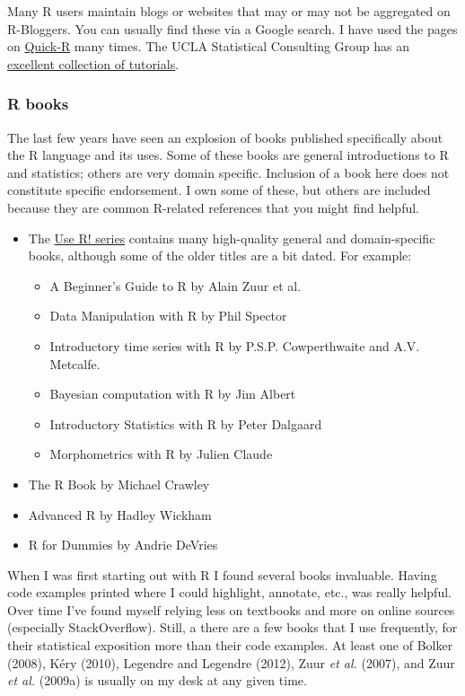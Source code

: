 \documentclass[
  13,
  letterpaper,
]{report}
\providecommand{\tightlist}{%
  \setlength{\itemsep}{0pt}\setlength{\parskip}{0pt}}
\begin{document}
Many R users maintain blogs or websites that may or may not be
aggregated on R-Bloggers. You can usually find these via a Google
search. I have used the pages on
\href{https://www.statmethods.net/}{Quick-R} many times. The UCLA
Statistical Consulting Group has an
\href{https://stats.oarc.ucla.edu/r/}{excellent collection of
tutorials}.

\subsubsection{R books}\label{sec-r-faq-help-books}

The last few years have seen an explosion of books published
specifically about the R language and its uses. Some of these books are
general introductions to R and statistics; others are very domain
specific. Inclusion of a book here does not constitute specific
endorsement. I own some of these, but others are included because they
are common R-related references that you might find helpful.

\begin{itemize}
\tightlist
\item
  The \href{https://www.springer.com/series/6991}{Use R! series}
  contains many high-quality general and domain-specific books, although
  some of the older titles are a bit dated. For example:

  \begin{itemize}
  \tightlist
  \item
    A Beginner's Guide to R by Alain Zuur et al.
  \item
    Data Manipulation with R by Phil Spector
  \item
    Introductory time series with R by P.S.P. Cowperthwaite and A.V.
    Metcalfe.
  \item
    Bayesian computation with R by Jim Albert
  \item
    Introductory Statistics with R by Peter Dalgaard
  \item
    Morphometrics with R by Julien Claude
  \end{itemize}
\item
  The R Book by Michael Crawley
\item
  Advanced R by Hadley Wickham
\item
  R for Dummies by Andrie DeVries
\end{itemize}

When I was first starting out with R I found several books invaluable.
Having code examples printed where I could highlight, annotate, etc.,
was really helpful. Over time I've found myself relying less on
textbooks and more on online sources (especially StackOverflow). Still,
a there are a few books that I use frequently, for their statistical
exposition more than their code examples. At least one of Bolker (2008),
Kéry (2010), Legendre and Legendre (2012), Zuur \emph{et al.} (2007),
and Zuur \emph{et al.} (2009a) is usually on my desk at any given time.
\end{document}
